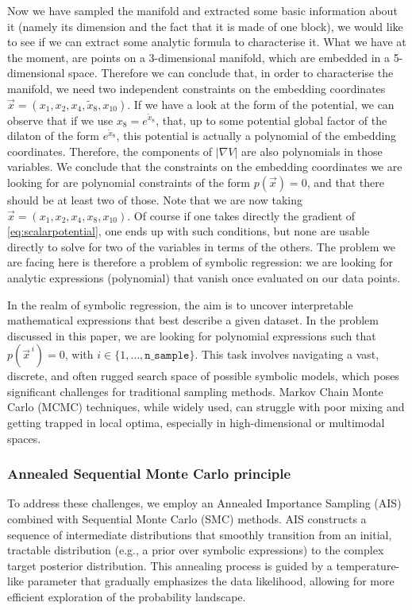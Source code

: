 \documentclass[11pt]{article}
\begin{document}
		Now we have sampled the manifold and extracted some basic information about it (namely its dimension and the fact that it is made of one block), we would like to see if we can extract some analytic formula to characterise it. What we have at the moment, are points on a 3-dimensional manifold, which are embedded in a 5-dimensional space. Therefore we can conclude that, in order to characterise the manifold, we need two independent constraints on the embedding coordinates $\vec{x} = (x_1,x_2,x_4,\tilde{x}_8,x_{10})$. If we have a look at the form of the potential, we can observe that if we use $x_{8} = e^{\tilde{x}_8}$, that, up to some potential global factor of the dilaton of the form $e^{\tilde{x}_8}$, this potential is actually a polynomial of the embedding coordinates. Therefore, the components of $|\nabla V|$ are also polynomials in those variables. We conclude that the constraints on the embedding coordinates we are looking for are polynomial constraints of the form $p(\vec{x}) = 0$, and that there should be at least two of those. Note that we are now taking $\vec{x} = (x_1,x_2,x_4,x_8,x_{10})$. Of course if one takes directly the gradient of \eqref{eq:scalarpotential}, one ends up with such conditions, but none are usable directly to solve for two of the variables in terms of the others. The problem we are facing here is therefore a problem of symbolic regression: we are looking for analytic expressions (polynomial) that vanish once evaluated on our data points. 

		
		In the realm of symbolic regression, the aim is to uncover interpretable mathematical expressions that best describe a given dataset. In the problem discussed in this paper, we are looking for polynomial expressions such that $p(\vec{x}^{\,i}) = 0$, with $i \in \{1, \dots, \texttt{n\_{sample}}\}$. This task involves navigating a vast, discrete, and often rugged search space of possible symbolic models, which poses significant challenges for traditional sampling methods. Markov Chain Monte Carlo (MCMC) techniques, while widely used, can struggle with poor mixing and getting trapped in local optima, especially in high-dimensional or multimodal spaces.
		
		\subsubsection{Annealed Sequential Monte Carlo principle}
		To address these challenges, we employ an Annealed Importance Sampling (AIS) combined with Sequential Monte Carlo (SMC) methods. AIS constructs a sequence of intermediate distributions that smoothly transition from an initial, tractable distribution (e.g., a prior over symbolic expressions) to the complex target posterior distribution. This annealing process is guided by a temperature-like parameter that gradually emphasizes the data likelihood, allowing for more efficient exploration of the probability landscape.
		
\end{document}
